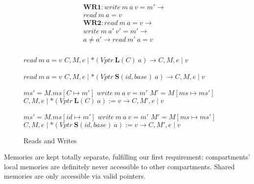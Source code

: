 \documentclass{article}
\begin{document}
\begin{figure}

  \begin{minipage}[t]{0.3\textwidth}
    \[\begin{aligned}
    \mathbf{WR1} : \mathit{write} ~ m ~ a ~ v = m' \rightarrow & \\
    \mathit{read} ~ m ~ a = v & \\[0.75em]
    \mathbf{WR2} : \mathit{read} ~ m ~ a = v \rightarrow & \\
    \mathit{write} ~ m ~ a' ~ v' = m' \rightarrow & \\
    a \not = a' \rightarrow \mathit{read} ~ m' ~ a = v & \\[0.75em]
    \end{aligned}\]
  \end{minipage}
  \begin{minipage}[t]{0.69\textwidth}
                {\(\mathit{read} ~ m ~ a = v\)}
                {\(C,M,e \mid *(\mathit{Vptr} ~ \mathbf{L}(C) ~ a)
                  \longrightarrow C,M,e \mid v\)}

                {\(\mathit{read} ~ m ~ a = v\)}
                {\(C,M,e \mid *(\mathit{Vptr} ~ \mathbf{S}(id, \mathit{base}) ~ a)
                  \longrightarrow C,M,e \mid v\)}

                  {\(ms' = M.ms[C\mapsto m']\)}
                  {\(\mathit{write} ~ m ~ a ~ v = m'\)}
                  {\(M' = M[ms \mapsto ms']\)}
                  {\(C,M,e \mid *(\mathit{Vptr} ~ \mathbf{L}(C) ~ a) := v
                    \longrightarrow C,M',e \mid v\)}

                  {\(ms' = M.ms[id \mapsto m']\)}
                  {\(\mathit{write} ~ m ~ a ~ v = m'\)}
                  {\(M' = M[ms \mapsto ms']\)}
                  {\(C,M,e \mid *(\mathit{Vptr} ~ \mathbf{S}(id, \mathit{base}) ~ a) := v
                    \longrightarrow C,M',e \mid v\)}
  \end{minipage}

  \caption{Reads and Writes}
  \label{subfig:rwstep}
\end{figure}

Memories are kept totally separate, fulfilling our first requirement:
compartments' local memories are definitely never accessible to other compartments.
Shared memories are only accessible via valid pointers.
\end{document}
